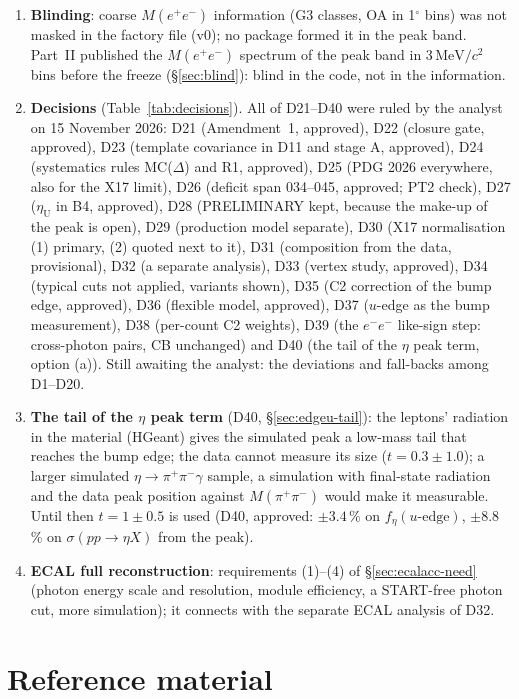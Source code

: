 \documentclass[11pt,a4paper]{article}
\newcommand{\pipi}{\ensuremath{\pi^{+}\pi^{-}}\xspace}
\newcommand{\Mee}{\ensuremath{M(e^{+}e^{-})}\xspace}
\newcommand{\Mpipi}{\ensuremath{M(\pi^{+}\pi^{-})}\xspace}
\newcommand{\MeVcc}{\ensuremath{\mathrm{MeV}/c^{2}}\xspace}
\newcommand{\sigeta}{\ensuremath{\sigma(pp\to\eta X)}\xspace}
\begin{document}
\begin{enumerate}
      the factory layouts).
\item \textbf{Blinding}: coarse \Mee information (G3 classes, OA in 1$^\circ$ bins) was not masked in the factory file (v0); no package formed it in
      the peak band. Part~II published the \Mee spectrum of the peak band in 3\,\MeVcc bins before the freeze (\S\ref{sec:blind}): blind in the code,
      not in the information.
\item \textbf{Decisions} (Table~\ref{tab:decisions}). All of D21--D40 were ruled by the analyst on 15 November 2026: D21 (Amendment~1,
      approved), D22 (closure gate, approved), D23 (template covariance in D11 and stage A, approved), D24 (systematics rules MC($\Delta$) and
      R1, approved), D25 (PDG 2026 everywhere, also for the X17 limit), D26 (deficit span 034--045, approved; PT2 check), D27
      ($\eta_{\mathrm{U}}$ in B4, approved), D28 (PRELIMINARY kept, because the make-up of the peak is open), D29 (production model separate), D30
      (X17 normalisation (1) primary, (2) quoted next to it), D31 (composition from the data, provisional), D32 (a separate analysis), D33
      (vertex study, approved), D34 (typical cuts not applied, variants shown), D35 (C2 correction of the bump edge, approved), D36 (flexible
      model, approved), D37 ($u$-edge as the bump measurement), D38 (per-count C2 weights), D39 (the $e^-e^-$ like-sign step: cross-photon
      pairs, CB unchanged) and D40 (the tail of the $\eta$ peak term, option (a)). Still awaiting the analyst: the deviations and fall-backs among
      D1--D20.
\item \textbf{The tail of the $\eta$ peak term} (D40, \S\ref{sec:edgeu-tail}): the leptons' radiation in the material (HGeant) gives the
      simulated peak a low-mass tail that reaches the bump edge; the data cannot measure its size ($t=0.3\pm1.0$); a larger simulated
      $\eta\to\pipi\gamma$ sample, a simulation with final-state radiation and the data peak position against \Mpipi would make it measurable.
      Until then $t=1\pm0.5$ is used (D40, approved: $\pm3.4$\,\% on $f_\eta(u\text{-edge})$, $\pm8.8$\,\% on \sigeta from the peak).
\item \textbf{ECAL full reconstruction}: requirements (1)--(4) of \S\ref{sec:ecalacc-need} (photon energy scale and resolution, module efficiency,
      a START-free photon cut, more simulation); it connects with the separate ECAL analysis of D32.
\end{enumerate}

\appendix
\part*{Reference material}
\end{document}

